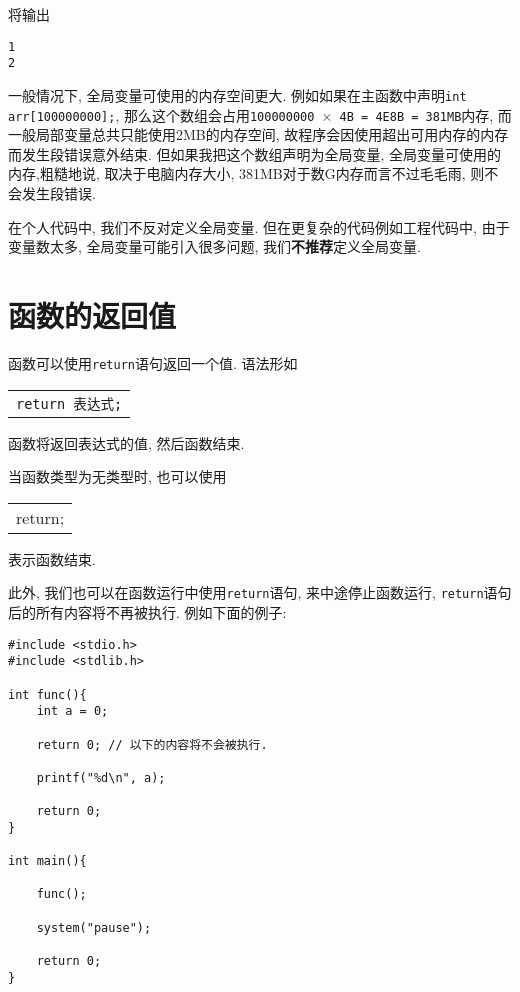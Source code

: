         将输出
\begin{lstlisting}
1
2
\end{lstlisting}

        \begin{sloppypar}
        一般情况下, 全局变量可使用的内存空间更大. 例如如果在主函数中声明\texttt{int arr[100000000];}, 那么这个数组会占用\texttt{100000000 $\times$ 4B = 4E8B = 381MB}内存, 而一般局部变量总共只能使用2MB的内存空间, 故程序会因使用超出可用内存的内存而发生段错误意外结束. 但如果我把这个数组声明为全局变量, 全局变量可使用的内存,粗糙地说, 取决于电脑内存大小, 381MB对于数G内存而言不过毛毛雨, 则不会发生段错误.
        \end{sloppypar}

        在个人代码中, 我们不反对定义全局变量. 但在更复杂的代码例如工程代码中, 由于变量数太多, 全局变量可能引入很多问题, 我们\textbf{不推荐}定义全局变量.

    \section{函数的返回值}
        函数可以使用\texttt{return}语句返回一个值. 语法形如
        \begin{center}
        \begin{longtable}{l}
            \texttt{return 表达式;}
        \end{longtable}
        \end{center}

        函数将返回表达式的值, 然后函数结束.

        当函数类型为无类型时, 也可以使用
        \begin{center}
        \begin{longtable}{l}
            return;
        \end{longtable}
        \end{center}
        表示函数结束.

        此外, 我们也可以在函数运行中使用\texttt{return}语句, 来中途停止函数运行, \texttt{return}语句后的所有内容将不再被执行. 例如下面的例子:
\begin{lstlisting}
#include <stdio.h>
#include <stdlib.h>

int func(){
    int a = 0;

    return 0; // 以下的内容将不会被执行.

    printf("%d\n", a);

    return 0;
}

int main(){

    func();

    system("pause");

    return 0;
}
\end{lstlisting}

